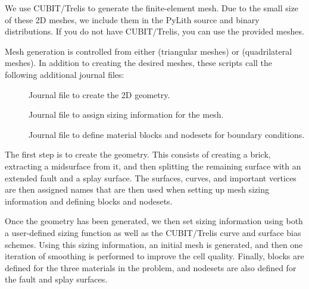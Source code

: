 We use CUBIT/Trelis to generate the finite-element mesh. Due to the
small size of these 2D meshes, we include them in the PyLith source
and binary distributions. If you do not have CUBIT/Trelis, you can
use the provided meshes.

Mesh generation is controlled from either 
(triangular meshes) or  (quadrilateral
meshes). In addition to creating the desired meshes, these scripts
call the following additional journal files:
\begin{description}
\item[] Journal file to create the 2D geometry.
\item[] Journal file to assign sizing
  information for the mesh.
\item[] Journal file to define material blocks
  and nodesets for boundary conditions.
\end{description}

The first step is to create the geometry. This consists of creating a
brick, extracting a midsurface from it, and then splitting the
remaining surface with an extended fault and a splay surface. The
surfaces, curves, and important vertices are then assigned names that
are then used when setting up mesh sizing information and defining
blocks and nodesets.


Once the geometry has been generated, we then set sizing information
using both a user-defined sizing function as well as the CUBIT/Trelis
curve and surface bias schemes. Using this sizing information, an
initial mesh is generated, and then one iteration of smoothing is
performed to improve the cell quality. Finally, blocks are defined for
the three materials in the problem, and nodesets are also defined for
the fault and splay surfaces.



